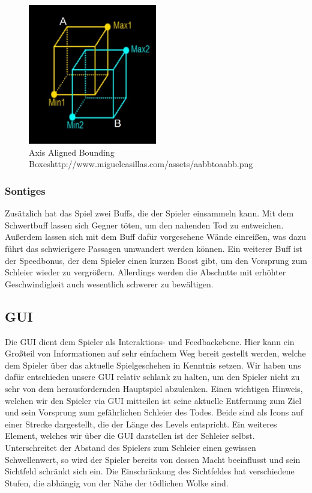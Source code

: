 \documentclass[10pt]{article}
\begin{document}
\begin{figure}[H]
	\centering
	\includegraphics[width=0.5\textwidth]{AABB}
	\caption{Axis Aligned Bounding Boxes\newline \tiny http://www.miguelcasillas.com/assets/aabbtoaabb.png 
		\label{fig:AABB}}
\end{figure}

\vspace{0.5cm}
\subsubsection{Sontiges}

Zusätzlich hat das Spiel zwei Buffs, die der Spieler einsammeln kann. Mit dem Schwertbuff lassen sich Gegner töten, um den nahenden Tod zu entweichen.
Außerdem lassen sich mit dem Buff dafür vorgesehene
Wände einreißen, was dazu führt das schwierigere Passagen umwandert werden können.
Ein weiterer Buff ist der Speedbonus, der dem Spieler einen kurzen Boost gibt, um den Vorsprung zum Schleier wieder zu vergrößern. Allerdings werden die Abschntte mit erhöhter Geschwindigkeit auch wesentlich schwerer zu bewältigen.

\vspace{0.5cm}
\subsection{GUI}
Die GUI dient dem Spieler als Interaktions- und Feedbackebene. Hier kann ein Großteil von Informationen auf sehr einfachem Weg bereit gestellt werden, welche dem Spieler über das aktuelle Spielgeschehen in Kenntnis setzen.
Wir haben uns dafür entschieden unsere GUI relativ schlank zu halten, um den Spieler nicht zu sehr von dem herausfordernden Hauptspiel abzulenken.
Einen wichtigen Hinweis, welchen wir den Spieler via GUI mitteilen ist seine aktuelle Entfernung zum Ziel und sein Vorsprung zum gefährlichen Schleier des Todes. Beide sind als Icons auf einer Strecke dargestellt, die der Länge des Levels entspricht. \newline
Ein weiteres Element, welches wir über die GUI darstellen ist der Schleier selbst. Unterschreitet der Abstand des Spielers zum Schleier einen gewissen Schwellenwert, so wird der Spieler bereits von dessen Macht beeinflusst und sein Sichtfeld schränkt sich ein. Die Einschränkung des Sichtfeldes hat verschiedene Stufen, die abhängig von der Nähe der tödlichen Wolke sind.
\end{document}

